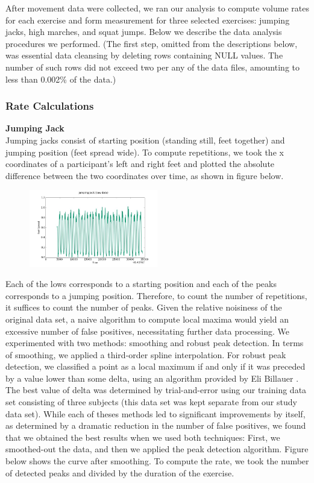 
After movement data were collected, we ran our analysis to compute volume rates for each exercise and form measurement for three selected exercises: jumping jacks, high marches, and squat jumps. Below we describe the data analysis procedures we performed. (The first step, omitted from the descriptions below, was essential data cleansing by deleting rows containing NULL values. The number of such rows did not exceed two per any of the data files, amounting to less than 0.002\% of the data.)

\subsubsection{Rate Calculations}
\textbf{Jumping Jack}  \\
Jumping jacks consist of starting position (standing still, feet together) and jumping position (feet spread wide). To compute repetitions, we took the x coordinates of a participant's left and right feet and plotted the absolute difference between the two coordinates over time, as shown in figure below.
\begin{figure} [htp]
	\includegraphics[width=0.5\textwidth]{images/jj_raw}
\end{figure}
Each of the lows corresponds to a starting position and each of the peaks corresponds to a jumping position. Therefore, to count the number of repetitions, it suffices to count the number of peaks. Given the relative noisiness of the original data set, a naive algorithm to compute local maxima would yield an excessive number of false positives, necessitating further data processing. We experimented with two methods: smoothing and robust peak detection. In terms of smoothing, we applied a third-order spline interpolation. For robust peak detection, we classified a point as a local maximum if and only if it was preceded by a value lower than some delta, using an algorithm provided by Eli Billauer \cite{Billauer}. The best value of delta was determined by trial-and-error using our training data set consisting of three subjects (this data set was kept separate from our study data set). While each of theses methods led to significant improvements by itself, as determined by a dramatic reduction in the number of false positives, we found that we obtained the best results when we used both techniques: First, we smoothed-out the data, and then we applied the peak detection algorithm. Figure below shows the curve after smoothing. To compute the rate, we took the number of detected peaks and divided by the duration of the exercise.
